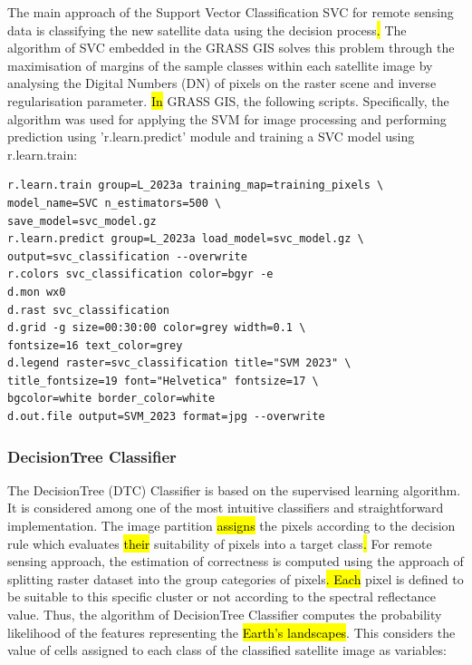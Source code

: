 \documentclass[eprint,
approc,		%
]{actapoly}
\begin{document}
The main approach of the Support Vector Classification SVC \citep{Cortes} for remote sensing data\hl{ }is classifying the new satellite data\hl{ }using the decision process\hl{. }The algorithm of SVC embedded in the GRASS GIS solves this problem through the maximisation of margins of the sample classes within each satellite image by analysing the Digital Numbers (DN) of pixels on the raster scene and inverse regularisation parameter. \hl{In} GRASS GIS, the following scripts. Specifically, the algorithm was used for applying the SVM for image processing and performing prediction using 'r.learn.predict' module and training a SVC model using r.learn.train:

\begin{footnotesize}
\begin{verbatim}
r.learn.train group=L_2023a training_map=training_pixels \
model_name=SVC n_estimators=500 \
save_model=svc_model.gz 
r.learn.predict group=L_2023a load_model=svc_model.gz \
output=svc_classification --overwrite
r.colors svc_classification color=bgyr -e
d.mon wx0
d.rast svc_classification
d.grid -g size=00:30:00 color=grey width=0.1 \
fontsize=16 text_color=grey
d.legend raster=svc_classification title="SVM 2023" \
title_fontsize=19 font="Helvetica" fontsize=17 \
bgcolor=white border_color=white
d.out.file output=SVM_2023 format=jpg --overwrite
\end{verbatim}
\end{footnotesize}

\subsubsection{DecisionTree Classifier}

The DecisionTree (DTC) Classifier is\hl{ }based on the supervised learning algorithm. It is considered among one of the most intuitive classifiers\hl{ }and straightforward implementation. The\hl{ }image partition \hl{assigns} the pixels\hl{ }according to the decision rule which evaluates \hl{their} suitability of pixels into a target class\hl{. }For remote sensing approach, the estimation of correctness is computed using the approach of splitting\hl{ }raster dataset into the group categories of pixels\hl{. Each} pixel is defined to be suitable to this specific cluster or not according to the spectral reflectance value. Thus, the algorithm of DecisionTree Classifier computes the probability likelihood of the features representing\hl{ }the \hl{Earth's landscapes}. This considers the value of cells assigned to each class of the classified satellite image as variables:
\end{document}

